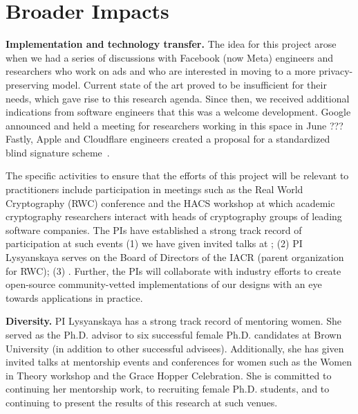 \section{Broader Impacts}
\noindent\textbf{Implementation and technology transfer.}  
The idea for this project arose when we had a series of discussions with Facebook (now Meta) engineers and researchers who work on ads and who are interested in moving to a more privacy-preserving model.  Current state of the art proved to be insufficient for their needs, which gave rise to this research agenda.
Since then, we received additional indications from software engineers that this was a welcome development.  Google announced  and held a meeting for researchers working in this space in June ???  Fastly, Apple and Cloudflare engineers created a proposal for a standardized blind signature scheme~\cite{}.  


The specific activities to ensure that the efforts of this project will be relevant to practitioners include participation in meetings such as the Real World Cryptography (RWC) conference and the HACS workshop at which academic cryptography researchers interact with heads of cryptography groups of leading software companies.  The PIs have established a strong track record of participation at such events (1) we have given invited talks at ; (2) PI Lysyanskaya serves on the Board of Directors of the IACR (parent organization for RWC); (3) .
Further, the PIs will collaborate with industry efforts to create open-source community-vetted implementations of our designs with an eye towards applications in practice.  

\noindent\textbf{Diversity.} PI Lysyanskaya has a strong track record of mentoring women.  She served as the Ph.D. advisor to six successful female Ph.D. candidates at Brown University (in addition to other successful advisees).  Additionally, she has given invited talks at mentorship events and conferences for women such as the Women in Theory workshop and the Grace Hopper Celebration.  She is committed to continuing her mentorship work, to recruiting female Ph.D. students, and to continuing to present the results of this research at such venues.


